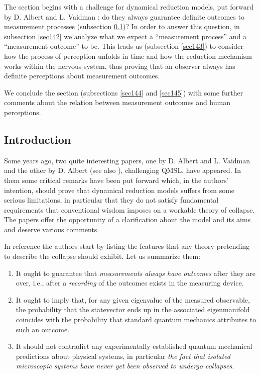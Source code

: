 \documentclass[12pt]{article}
\begin{document}
The section begins with a challenge for dynamical reduction
models, put forward by D. Albert and L. Vaidman \cite{avp,ap}: do
they always guarantee definite outcomes to measurement processes
(subsection \ref{sec141})? In order to answer this question, in
subsection \ref{sec142} we analyze what we expect a ``measurement
process'' and a ``measurement outcome'' to be. This leads us
(subsection \ref{sec143}) to consider how the process of
perception unfolds in time and how the reduction mechanism works
within the nervous system, thus proving that an observer always
has definite perceptions about measurement outcomes.

We conclude the section (subsections \ref{sec144} and
\ref{sec145}) with some further comments about the relation
between measurement outcomes and human perceptions.



\subsection{Introduction} \label{sec141}

Some years ago, two quite interesting papers, one by D. Albert and
L. Vaidman \cite{avp} and the other by D. Albert \cite{ap} (see
also \cite{al5}), challenging QMSL, have appeared. In them some
critical remarks have been put forward which, in the authors'
intention, should prove that dynamical reduction models suffers
from some serious limitations, in particular that they do not
satisfy fundamental requirements that conventional wisdom imposes
on a workable theory of collapse. The papers offer the opportunity
of a clarification about the model and its aims and deserve
various comments.

In reference \cite{avp} the authors start by listing the features
that any theory pretending to describe the collapse should
exhibit. Let us summarize them:
\begin{enumerate}
\item It ought to guarantee that {\it measurements always have
outcomes} after they are over, i.e., after a {\it recording} of
the outcomes exists in the measuring device.

\item It ought to imply that, for any given eigenvalue of the
measured observable, the probability that the statevector ends up
in  the associated eigenmanifold coincides with the probability
that standard quantum mechanics attributes to such an outcome.

\item It should not contradict any experimentally established
quantum mechanical predictions about physical systems, in
particular {\it the fact that isolated microscopic systems have
never yet been observed to undergo collapses}.
\end{enumerate}
\end{document}

